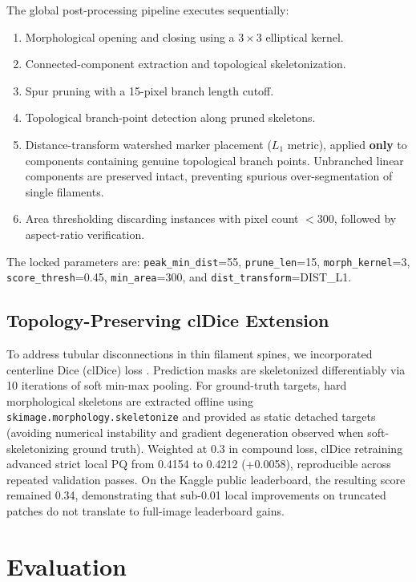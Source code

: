 \documentclass[sigconf]{acmart}
\begin{document}
The global post-processing pipeline executes sequentially:
\begin{enumerate}
    \item Morphological opening and closing using a $3\times3$ elliptical kernel.
    \item Connected-component extraction and topological skeletonization.
    \item Spur pruning with a 15-pixel branch length cutoff.
    \item Topological branch-point detection along pruned skeletons.
    \item Distance-transform watershed marker placement ($L_1$ metric), applied \textbf{only} to components containing genuine topological branch points. Unbranched linear components are preserved intact, preventing spurious over-segmentation of single filaments.
    \item Area thresholding discarding instances with pixel count $<300$, followed by aspect-ratio verification.
\end{enumerate}
The locked parameters are: \texttt{peak\_min\_dist}=55, \texttt{prune\_len}=15, \texttt{morph\_kernel}=3, \texttt{score\_thresh}=0.45, \texttt{min\_area}=300, and \texttt{dist\_transform}=DIST\_L1.

\subsection{Topology-Preserving clDice Extension}\label{sec:cldice}
To address tubular disconnections in thin filament spines, we incorporated centerline Dice (clDice) loss \cite{shit2021cldice}. Prediction masks are skeletonized differentiably via 10 iterations of soft min-max pooling. For ground-truth targets, hard morphological skeletons are extracted offline using \texttt{skimage.morphology.skeletonize} and provided as static detached targets (avoiding numerical instability and gradient degeneration observed when soft-skeletonizing ground truth). Weighted at 0.3 in compound loss, clDice retraining advanced strict local PQ from 0.4154 to 0.4212 (+0.0058), reproducible across repeated validation passes. On the Kaggle public leaderboard, the resulting score remained 0.34, demonstrating that sub-0.01 local improvements on truncated patches do not translate to full-image leaderboard gains.

\section{Evaluation}\label{sec:evaluation}
\end{document}
